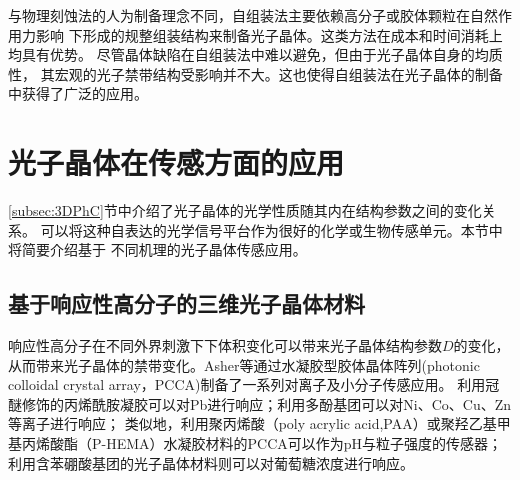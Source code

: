 与物理刻蚀法的人为制备理念不同，自组装法主要依赖高分子或胶体颗粒在自然作用力影响
下形成的规整组装结构来制备光子晶体。这类方法在成本和时间消耗上均具有优势。
尽管晶体缺陷在自组装法中难以避免，但由于光子晶体自身的均质性，
其宏观的光子禁带结构受影响并不大。这也使得自组装法在光子晶体的制备中获得了广泛的应用。

\section{光子晶体在传感方面的应用}
\label{sec:PhC-sensing}

\ref{subsec:3DPhC}节中介绍了光子晶体的光学性质随其内在结构参数之间的变化关系。
可以将这种自表达的光学信号平台作为很好的化学或生物传感单元。本节中将简要介绍基于
不同机理的光子晶体传感应用。

\subsection{基于响应性高分子的三维光子晶体材料}
\label{subsec:ion-response}
响应性高分子在不同外界刺激下下体积变化可以带来光子晶体结构参数$D$的变化，从而带来光子晶体的禁带变化。Asher等通过水凝胶型胶体晶体阵列(photonic colloidal crystal array，PCCA)制备了一系列对离子及小分子传感应用。
利用冠醚修饰的丙烯酰胺凝胶可以对Pb进行响应\cite{Reese2001Development}；利用多酚基团可以对Ni、Co、Cu、Zn等离子进行响应\cite{Asher2003Photonic}；
类似地，利用聚丙烯酸（poly acrylic acid,PAA）或聚羟乙基甲基丙烯酸酯（P-HEMA）水凝胶材料的PCCA可以作为pH与粒子强度的传感器\cite{Lee2000Photonic,Xu2008Polymerized}；
利用含苯硼酸基团的光子晶体材料则可以对葡萄糖浓度进行响应\cite{Honda2009Confined}。

